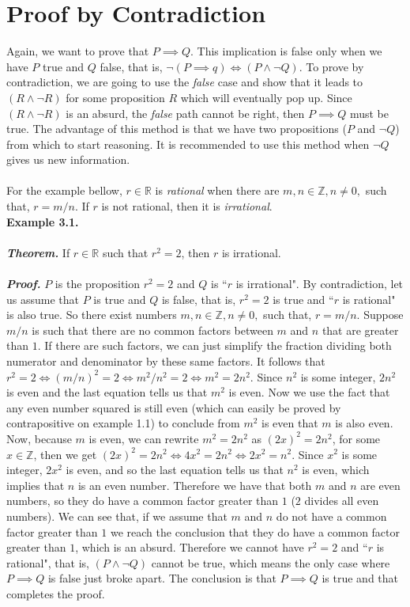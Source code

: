 \documentclass[]{article}
\begin{document}
\section{Proof by Contradiction}
Again, we want to prove that $P \implies Q$. This implication is false only when we have $P$ true and $Q$ false, that is, $\neg(P \implies q) \iff (P \wedge \neg Q)$. To prove by contradiction, we are going to use the \emph{false} case and show that it leads to $(R \wedge \neg R)$ for some proposition $R$ which will eventually pop up. Since $(R \wedge \neg R)$ is an absurd, the \emph{false} path cannot be right, then $P \implies Q$ must be true. The advantage of this method is that we have two propositions ($P$ and $\neg Q$) from which to start reasoning. It is recommended to use this method when $\neg Q$ gives us new information.\\\\
For the example bellow, $r \in \mathbb{R}$ is \textit{rational} when there are $m,n \in \mathbb{Z}, n \neq 0,$ such that, $r = m / n$. If $r$ is not rational, then it is \textit{irrational}. \\

\textbf{Example 3.1.}\\\\
\textit{\textbf{Theorem.}} If $r \in \mathbb{R}$ such that $r^2 = 2$, then $r$ is irrational.
\\\\\textit{\textbf{Proof.}} $P$ is the proposition  $r^2 = 2$ and $Q$ is ``$r$ is irrational". By contradiction, let us assume that $P$ is true and $Q$ is false, that is, $r^2 = 2$ is true and ``$r$ is rational" is also true. So there exist numbers $m,n \in \mathbb{Z}, n \neq 0,$ such that, $r = m / n$. Suppose $m/n$ is such that there are no common factors between $m$ and $n$ that are greater than $1$. If there are such factors, we can just simplify the fraction dividing both numerator and denominator by these same factors. It follows that $r^2 = 2 \iff (m / n)^2 = 2 \iff m^2 / n^2 = 2 \iff m^2 = 2n^2$. Since $n^2$ is some integer, $2n^2$ is even and the last equation tells us that $m^2$ is even. Now we use the fact that any even number squared is still even (which can easily be proved by contrapositive on example 1.1) to conclude from $m^2$ is even that $m$ is also even. Now, because $m$ is even, we can rewrite $m^2 = 2n^2$ as $(2x)^2 = 2n^2$, for some $x \in \mathbb{Z}$, then we get $(2x)^2 = 2n^2 \iff 4x^2 = 2n^2 \iff 2x^2 = n^2$. Since $x^2$ is some integer, $2x^2$ is even, and so the last equation tells us that $n^2$ is even, which implies that $n$ is an even number. Therefore we have that both $m$ and $n$ are even numbers, so they do have a common factor greater than $1$ ($2$ divides all even numbers). We can see that, if we assume that $m$ and $n$ do not have a common factor greater than $1$ we reach the conclusion that they do have a common factor greater than $1$, which is an absurd. Therefore we cannot have $r^2 = 2$ and ``$r$ is rational", that is, $(P \wedge \neg Q)$ cannot be true, which means the only case where $P \implies Q$ is false just broke apart. The conclusion is that $P \implies Q$ is true and that completes the proof.
\end{document}
